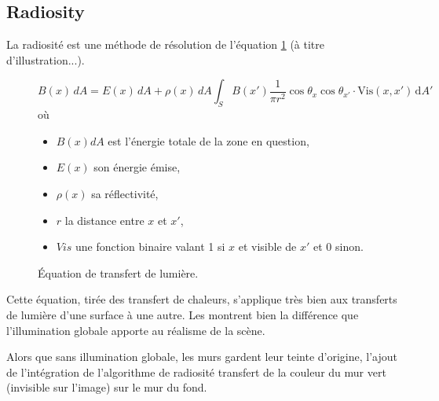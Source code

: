 \subsection{Radiosity\label{sec:radiosity}}
La radiosité est une méthode de résolution de l'équation \ref{eq:radiosity} (à
titre d'illustration...).
\begin{figure}[h]
  $$B(x)\, dA = E(x) \, dA +\rho(x) \, dA \int_{S}B(x') \frac{1}{\pi r^2}
  \cos\theta_x\cos\theta_{x'} \cdot \mathrm{Vis}(x,x') \,\mathrm dA'$$
  où \begin{itemize}
    \item $B(x)dA$ est l'énergie totale de la zone en question,
    \item $E(x)$ son énergie émise,
    \item $\rho (x)$ sa réflectivité,
    \item $r$ la distance entre $x$ et $x'$,
    \item $Vis$ une fonction binaire valant 1 si $x$ et visible de $x'$ et 0
      sinon.
  \end{itemize}
  \caption{Équation de transfert de
  lumière.\label{eq:radiosity}\cite{wikipediaRadiosity}}
\end{figure}

Cette équation, tirée des transfert de chaleurs, s'applique très bien aux
transferts de lumière d'une surface à une autre. Les
 montrent bien la différence
que l'illumination globale apporte au réalisme de la scène. 

Alors que sans illumination globale, les murs gardent leur teinte d'origine,
l'ajout de l'intégration de l'algorithme de radiosité transfert de la couleur
du mur vert (invisible sur l'image) sur le mur du fond. 

\begin{figure}[h]
  \begin{center}
  \end{center}
\end{figure}

